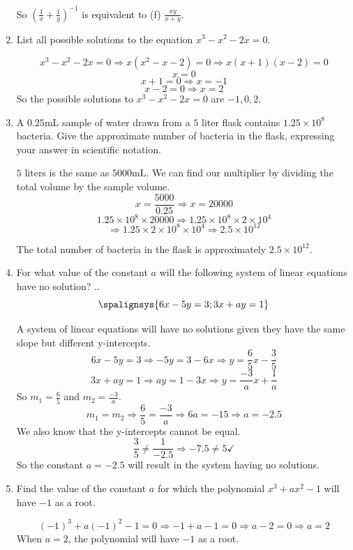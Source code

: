\documentclass{article}
\begin{document}
\begin{enumerate}
So ${\left(\frac{1}{x} + \frac{1}{y}\right)}^{-1}$ is equivalent to (f) $\frac{xy}{x + y}$.

\item List all possible solutions to the equation $x^{3} - x^{2} - 2x = 0$.

\[x^{3} - x^{2} - 2x = 0 \Longrightarrow x(x^{2} - x - 2) = 0 \Longrightarrow x(x + 1)(x - 2) = 0\]
\[x = 0\]
\[x + 1 = 0 \Longrightarrow x = -1\]
\[x - 2 = 0 \Longrightarrow x = 2\]
So the possible solutions to $x^{3} - x^{2} - 2x = 0$ are $-1, 0, 2$.

\item A $0.25$mL sample of water drawn from a $5$ liter flask contains $1.25\times 10^{8}$ bacteria.
Give the approximate number of bacteria in the flask, expressing your answer in scientific notation.

$5$ liters is the same as $5000$mL. We can find our multiplier by dividing the total volume by the sample volume.
\[x = \frac{5000}{0.25} \Longrightarrow x = 20000\]
\[1.25 \times 10^{8} \times 20000 \Longrightarrow 1.25 \times 10^{8} \times 2 \times 10^{4}\]
\[\Longrightarrow 1.25 \times 2 \times 10^{8} \times 10^{4} \Longrightarrow 2.5 \times 10^{12}\]

The total number of bacteria in the flask is approximately $2.5 \times 10^{12}$.

\item For what value of the constant $a$ will the following system of linear equations have no solution?
\spalignsysdelims..
\[
  \spalignsys{
    6x - 5y = 3;
    3x + ay = 1
  }
\]

A system of linear equations will have no solutions given they have the same slope but different y-intercepts.
\[6x - 5y = 3 \Longrightarrow -5y = 3 - 6x \Longrightarrow y = \frac{6}{5}x - \frac{3}{5}\]
\[3x + ay = 1 \Longrightarrow ay = 1 - 3x \Longrightarrow y = \frac{-3}{a}x + \frac{1}{a}\]
So $m_{1} = \frac{6}{5}$ and $m_{2} = \frac{-3}{a}$.
\[m_{1} = m_{2} \Longrightarrow \frac{6}{5} = \frac{-3}{a} \Longrightarrow 6a = -15 \Longrightarrow a = -2.5\]
We also know that the y-intercepts cannot be equal.
\[\frac{3}{5} \neq \frac{1}{-2.5} \Longrightarrow -7.5 \neq 5 \checkmark\]
So the constant $a = -2.5$ will result in the system having no solutions.

\item Find the value of the constant $a$ for which the polynomial $x^{3} + ax^{2} - 1$ will have $-1$ as a root.

\[{(-1)}^{3} + a{(-1)}^{2} - 1 = 0 \Longrightarrow -1 + a - 1 = 0 \Longrightarrow a - 2 = 0 \Longrightarrow a = 2\]
When $a = 2$, the polynomial will have $-1$ as a root.


\end{enumerate}
\end{document}

